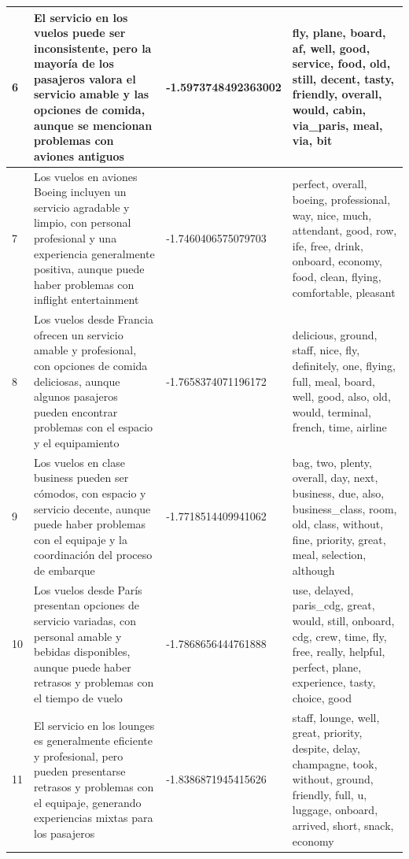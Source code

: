 \documentclass{report}
\begin{document}
{{\begin{longtable}{|p{1cm}|p{4cm}|p{4cm}|p{6cm}|}
                    \hline
                    6 & El servicio en los vuelos puede ser inconsistente, pero la mayoría de los pasajeros valora el servicio amable y las opciones de comida, aunque se mencionan problemas con aviones antiguos & -1.5973748492363002 & fly, plane, board, af, well, good, service, food, old, still, decent, tasty, friendly, overall, would, cabin, via\_paris, meal, via, bit \\
                    \hline
                    7 & Los vuelos en aviones Boeing incluyen un servicio agradable y limpio, con personal profesional y una experiencia generalmente positiva, aunque puede haber problemas con inflight entertainment & -1.7460406575079703 & perfect, overall, boeing, professional, way, nice, much, attendant, good, row, ife, free, drink, onboard, economy, food, clean, flying, comfortable, pleasant \\
                    \hline
                    8 & Los vuelos desde Francia ofrecen un servicio amable y profesional, con opciones de comida deliciosas, aunque algunos pasajeros pueden encontrar problemas con el espacio y el equipamiento & -1.7658374071196172 & delicious, ground, staff, nice, fly, definitely, one, flying, full, meal, board, well, good, also, old, would, terminal, french, time, airline \\
                    \hline
                    9 & Los vuelos en clase business pueden ser cómodos, con espacio y servicio decente, aunque puede haber problemas con el equipaje y la coordinación del proceso de embarque & -1.7718514409941062 & bag, two, plenty, overall, day, next, business, due, also, business\_class, room, old, class, without, fine, priority, great, meal, selection, although \\
                    \hline
                    10 & Los vuelos desde París presentan opciones de servicio variadas, con personal amable y bebidas disponibles, aunque puede haber retrasos y problemas con el tiempo de vuelo & -1.7868656444761888 & use, delayed, paris\_cdg, great, would, still, onboard, cdg, crew, time, fly, free, really, helpful, perfect, plane, experience, tasty, choice, good \\
                    \hline
                    11 & El servicio en los lounges es generalmente eficiente y profesional, pero pueden presentarse retrasos y problemas con el equipaje, generando experiencias mixtas para los pasajeros & -1.8386871945415626 & staff, lounge, well, great, priority, despite, delay, champagne, took, without, ground, friendly, full, u, luggage, onboard, arrived, short, snack, economy \\

\end{longtable}}}
\end{document}
